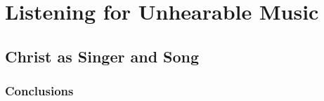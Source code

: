 
\part{Listening for Unhearable Music}
\label{part:ListeningForUnhearableMusic}

\chapter{Christ as Singer and Song}








\section{Conclusions}
